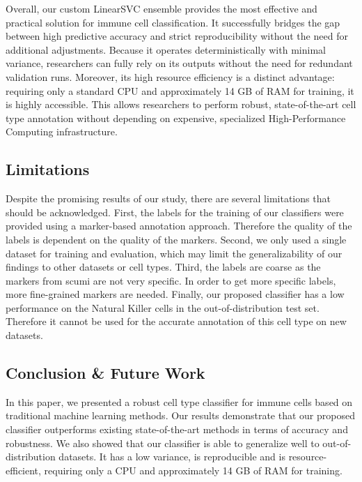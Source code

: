 \documentclass[11pt]{article}
\begin{document}
Overall, our custom LinearSVC ensemble provides the most effective and practical solution for immune cell classification. It successfully bridges the gap between high predictive accuracy and strict reproducibility without the need for additional adjustments. Because it operates deterministically with minimal variance, researchers can fully rely on its outputs without the need for redundant validation runs. Moreover, its high resource efficiency is a distinct advantage: requiring only a standard CPU and approximately 14 GB of RAM for training, it is highly accessible. This allows researchers to perform robust, state-of-the-art cell type annotation without depending on expensive, specialized High-Performance Computing infrastructure.



\subsection{Limitations}\label{sec:discussion:limitations}

Despite the promising results of our study, there are several limitations that should be acknowledged. First, the labels for the training of our classifiers were provided using a marker-based annotation approach. Therefore the quality of the labels is dependent on the quality of the markers. 
Second, we only used a single dataset for training and evaluation, which may limit the generalizability of our findings to other datasets or cell types.
Third, the labels are coarse as the markers from scumi are not very specific. In order to get more specific labels, more fine-grained markers are needed.
Finally, our proposed classifier has a low performance on the Natural Killer cells in the out-of-distribution test set. Therefore it cannot be used for the accurate annotation of this cell type on new datasets.

\subsection{Conclusion \& Future Work}\label{sec:discussion:conclusion}

In this paper, we presented a robust cell type classifier for immune cells based on traditional machine learning methods. Our results demonstrate that our proposed classifier outperforms existing state-of-the-art methods in terms of accuracy and robustness. We also showed that our classifier is able to generalize well to out-of-distribution datasets. It has a low variance, is reproducible and is resource-efficient, requiring only a CPU and approximately 14 GB of RAM for training.
\end{document}
